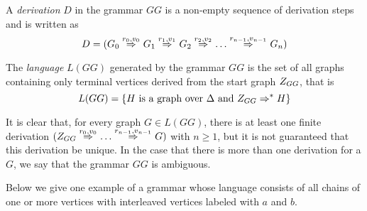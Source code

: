 \begin{definition}
	A \emph{derivation} $D$ in the grammar $GG$ is a non-empty sequence of derivation steps and is written as
	\[ 
		D = (G_0 \deriv{r_0}{v_0}{} G_1 \deriv{r_1}{v_1}{} G_2 \deriv{r_2}{v_2}{} \dots \deriv{r_{n-1}}{v_{n-1}}{} G_n)
	\]
\end{definition}

\begin{definition}
	The \emph{language} $L(GG)$ generated by the grammar $GG$ is the set of all graphs containing only terminal vertices derived from the start graph $Z_{GG}$, that is
	\[
		L(GG) = \{H \text{ is a graph over } \Delta \text{ and } Z_{GG} \Rightarrow^*_{} H\}
	\]
\end{definition}

It is clear that, for every graph $G \in L(GG)$, there is at least one finite derivation $(\startG{GG} \deriv{r_0}{v_0}{} \dots \deriv{r_{n-1}}{v_{n-1}}{} G)$ with $n \ge 1$, but it is not guaranteed that this derivation be unique. In the case that there is more than one derivation for a $G$, we say that the grammar $GG$ is ambiguous.

Below we give one example of a grammar whose language consists of all chains of one or more vertices with interleaved vertices labeled with $a$ and $b$.

